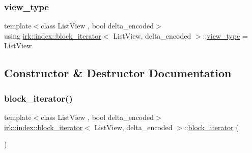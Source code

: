 \subsubsection{\texorpdfstring{view\+\_\+type}{view\_type}}
{\footnotesize\ttfamily template$<$class List\+View , bool delta\+\_\+encoded$>$ \\
using \mbox{\hyperlink{classirk_1_1index_1_1block__iterator}{irk\+::index\+::block\+\_\+iterator}}$<$ List\+View, delta\+\_\+encoded $>$\+::\mbox{\hyperlink{classirk_1_1index_1_1block__iterator_a75bc89b691db97f719af7284ee91afa0}{view\+\_\+type}} =  List\+View}



\subsection{Constructor \& Destructor Documentation}
\mbox{\label{classirk_1_1index_1_1block__iterator_ad6c58cc01009120754c5c3797a6deb82}} 
\subsubsection{\texorpdfstring{block\+\_\+iterator()}{block\_iterator()}\hspace{0.1cm}{\footnotesize\ttfamily [1/3]}}
{\footnotesize\ttfamily template$<$class List\+View , bool delta\+\_\+encoded$>$ \\
\mbox{\hyperlink{classirk_1_1index_1_1block__iterator}{irk\+::index\+::block\+\_\+iterator}}$<$ List\+View, delta\+\_\+encoded $>$\+::\mbox{\hyperlink{classirk_1_1index_1_1block__iterator}{block\+\_\+iterator}} (\begin{DoxyParamCaption}{ }\end{DoxyParamCaption})\hspace{0.3cm}{\ttfamily [default]}}

\mbox{\label{classirk_1_1index_1_1block__iterator_a00174f254405749a39d2009b2a6819bf}} 

